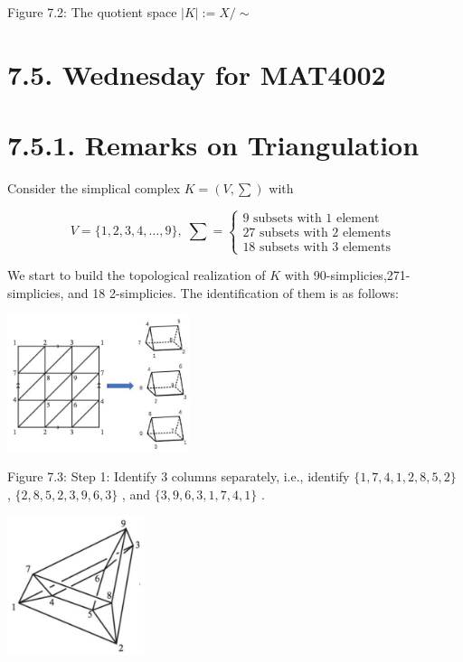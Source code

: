 Figure 7.2: The quotient space \(\left| K\right|  \mathrel{\text{ := }} X/ \sim\)

\section*{7.5. Wednesday for MAT4002}

\section*{7.5.1. Remarks on Triangulation}

Consider the simplical complex \(K = \left( {V,\sum }\right)\) with

\[
V = \{ 1,2,3,4,\ldots ,9\} ,\;\sum  = \left\{  \begin{array}{r} 9\text{ subsets with }1\text{ element } \\  {27}\text{ subsets with }2\text{ elements } \\  {18}\text{ subsets with }3\text{ elements } \end{array}\right.
\]

We start to build the topological realization of \(K\) with 90-simplicies,271-simplicies, and 18 2-simplicies. The identification of them is as follows:

\begin{center}
\includegraphics[max width=0.4\textwidth]{images/bo_d2bcsrref24c73avs720_77_543_985_515_386_0.jpg}
\end{center}
\hspace*{3em} 

Figure 7.3: Step 1: Identify 3 columns separately, i.e., identify \(\{ 1,7,4,1,2,8,5,2\}\) , \(\{ 2,8,5,2,3,9,6,3\}\) , and \(\{ 3,9,6,3,1,7,4,1\}\) .

\begin{center}
\includegraphics[max width=0.3\textwidth]{images/bo_d2bcsrref24c73avs720_77_643_1563_366_371_0.jpg}
\end{center}
\hspace*{3em} 

